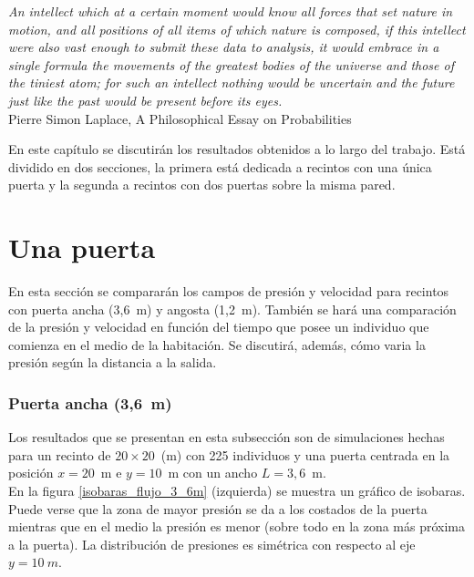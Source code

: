 \begin{flushleft}
 {\footnotesize{ \textsl {An intellect which at a certain moment would know all forces that set nature in motion, and all positions of all items of which nature is composed, if this intellect were also vast enough to submit these data to analysis, it would embrace in a single formula the movements of the greatest bodies of the universe and those of the tiniest atom; for such an intellect nothing would be uncertain and the future just like the past would be present before its eyes.}}} \\
\footnotesize  Pierre Simon Laplace, A Philosophical Essay on Probabilities\\
\end{flushleft}

En este capítulo se discutirán los resultados obtenidos a lo largo del trabajo. Está dividido en dos secciones, la primera está dedicada a recintos con una única puerta y la segunda a recintos con dos puertas sobre la misma pared.  

\section{Una puerta}

En esta sección se compararán los campos de presión y velocidad para recintos con puerta ancha (3,6~m) y angosta (1,2~m). También se hará una comparación de la presión y velocidad en función del tiempo que posee un individuo que comienza en el medio de la habitación. Se discutirá, además, cómo varia la presión según la distancia a la salida.     

\subsubsection{Puerta ancha (3,6~m)}

Los resultados que se presentan en esta subsección son de simulaciones hechas para un recinto de  $20\times 20$~(m) con 225 individuos y una puerta centrada en la posición $x=20$~m e $y=10$~m con un ancho $L=3,6$~m.\\

En la figura \ref{isobaras_flujo_3_6m} (izquierda) se muestra un gráfico de isobaras. Puede verse que la zona de mayor presión se da a los costados de la puerta mientras que en el medio la presión es menor (sobre todo en la zona más próxima a la puerta). La distribución de presiones es simétrica con respecto al eje $y=10~m$. 

